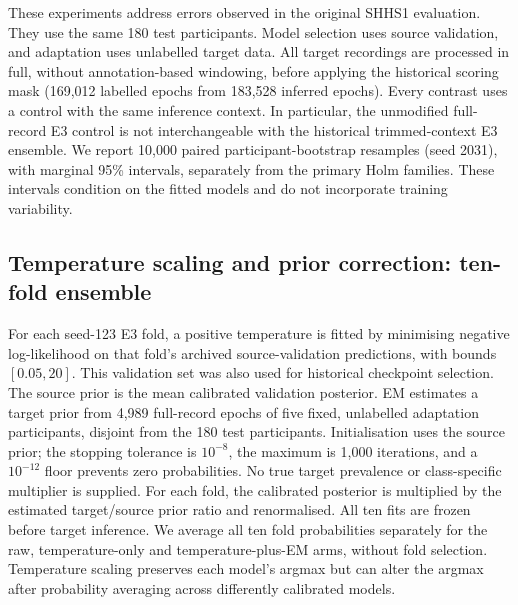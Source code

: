 \documentclass[10pt,a4paper]{article}
\begin{document}
These experiments address errors observed in the original SHHS1 evaluation. They use the same
180 test participants. Model selection uses source validation, and adaptation uses unlabelled
target data. All target recordings are processed in full, without annotation-based
windowing, before applying the historical scoring mask (169,012 labelled epochs from 183,528
inferred epochs). Every contrast uses a control with the same inference context. In particular,
the unmodified full-record E3 control is not interchangeable with the historical trimmed-context
E3 ensemble. We report 10,000 paired participant-bootstrap resamples (seed 2031), with marginal
95\% intervals, separately from the primary Holm families. These intervals condition on the fitted
models and do not incorporate training variability.

\subsection*{Temperature scaling and prior correction: ten-fold ensemble}

For each seed-123 E3 fold, a positive temperature is fitted by minimising negative log-likelihood
on that fold's archived source-validation predictions, with bounds $[0.05,20]$. This validation
set was also used for historical checkpoint selection. The source prior is the mean calibrated
validation posterior. EM estimates a target prior from 4,989 full-record epochs of five fixed,
unlabelled adaptation participants, disjoint from the 180 test participants. Initialisation uses
the source prior; the stopping tolerance is $10^{-8}$, the maximum is 1,000 iterations, and a
$10^{-12}$ floor prevents zero probabilities. No true target prevalence or class-specific
multiplier is supplied. For each fold, the calibrated posterior is multiplied by the estimated
target/source prior ratio and renormalised. All ten fits are frozen before target inference.
We average all ten fold probabilities separately for the raw, temperature-only and
temperature-plus-EM arms, without fold selection. Temperature scaling preserves each model's
argmax but can alter the argmax after probability averaging across differently calibrated models.
\end{document}
